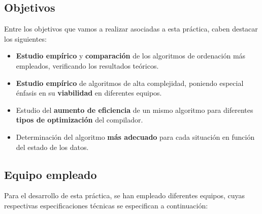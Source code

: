 \documentclass{homework}
\begin{document}
    \subsection{Objetivos} 

    Entre los objetivos que vamos a realizar asociadas a esta práctica, caben destacar los siguientes: 

    \begin{itemize}
        \item \textbf{Estudio empírico} y \textbf{comparación} de los algoritmos de ordenación más empleados, verificando los resultados teóricos.
        \item \textbf{Estudio empírico} de algoritmos de alta complejidad, poniendo especial énfasis en su \textbf{viabilidad} en diferentes equipos. 
        \item Estudio del \textbf{aumento de eficiencia} de un mismo algoritmo para diferentes \textbf{tipos de optimización} del compilador. 
        \item Determinación del algoritmo \textbf{más adecuado} para cada situación en función del estado de los datos.
    \end{itemize}

    \subsection{Equipo empleado}

    Para el desarrollo de esta práctica, se han empleado diferentes equipos, cuyas respectivas especificaciones técnicas se 
    especifican a continuación:
    
\end{document}
